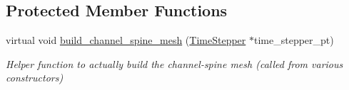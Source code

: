 \subsection*{Protected Member Functions}
\begin{DoxyCompactItemize}
\item 
virtual void \hyperlink{classoomph_1_1ChannelSpineMesh_a12eae5013f54ae04f9eb1cdffacf3955}{build\+\_\+channel\+\_\+spine\+\_\+mesh} (\hyperlink{classoomph_1_1TimeStepper}{Time\+Stepper} $\ast$time\+\_\+stepper\+\_\+pt)
\begin{DoxyCompactList}\small\item\em Helper function to actually build the channel-\/spine mesh (called from various constructors) \end{DoxyCompactList}\end{DoxyCompactItemize}
